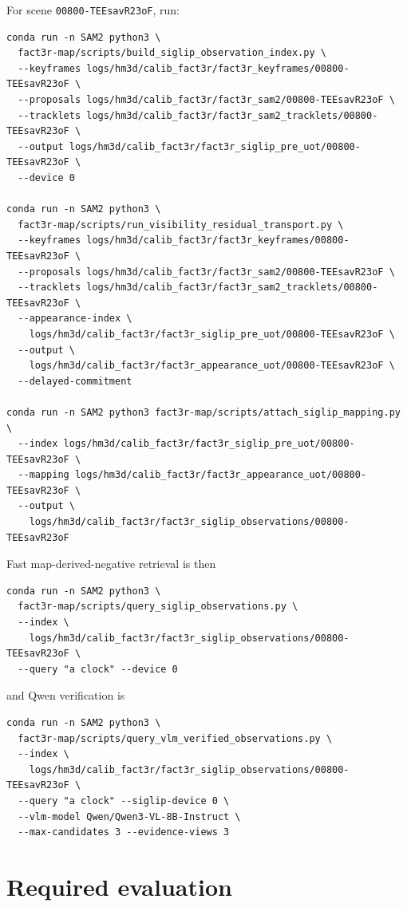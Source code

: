 \documentclass[11pt]{article}
\newcommand{\1}{\bm{1}}
\begin{document}
For scene \texttt{00800-TEEsavR23oF}, run:
\begin{verbatim}
conda run -n SAM2 python3 \
  fact3r-map/scripts/build_siglip_observation_index.py \
  --keyframes logs/hm3d/calib_fact3r/fact3r_keyframes/00800-TEEsavR23oF \
  --proposals logs/hm3d/calib_fact3r/fact3r_sam2/00800-TEEsavR23oF \
  --tracklets logs/hm3d/calib_fact3r/fact3r_sam2_tracklets/00800-TEEsavR23oF \
  --output logs/hm3d/calib_fact3r/fact3r_siglip_pre_uot/00800-TEEsavR23oF \
  --device 0

conda run -n SAM2 python3 \
  fact3r-map/scripts/run_visibility_residual_transport.py \
  --keyframes logs/hm3d/calib_fact3r/fact3r_keyframes/00800-TEEsavR23oF \
  --proposals logs/hm3d/calib_fact3r/fact3r_sam2/00800-TEEsavR23oF \
  --tracklets logs/hm3d/calib_fact3r/fact3r_sam2_tracklets/00800-TEEsavR23oF \
  --appearance-index \
    logs/hm3d/calib_fact3r/fact3r_siglip_pre_uot/00800-TEEsavR23oF \
  --output \
    logs/hm3d/calib_fact3r/fact3r_appearance_uot/00800-TEEsavR23oF \
  --delayed-commitment

conda run -n SAM2 python3 fact3r-map/scripts/attach_siglip_mapping.py \
  --index logs/hm3d/calib_fact3r/fact3r_siglip_pre_uot/00800-TEEsavR23oF \
  --mapping logs/hm3d/calib_fact3r/fact3r_appearance_uot/00800-TEEsavR23oF \
  --output \
    logs/hm3d/calib_fact3r/fact3r_siglip_observations/00800-TEEsavR23oF
\end{verbatim}

Fast map-derived-negative retrieval is then
\begin{verbatim}
conda run -n SAM2 python3 \
  fact3r-map/scripts/query_siglip_observations.py \
  --index \
    logs/hm3d/calib_fact3r/fact3r_siglip_observations/00800-TEEsavR23oF \
  --query "a clock" --device 0
\end{verbatim}
and Qwen verification is
\begin{verbatim}
conda run -n SAM2 python3 \
  fact3r-map/scripts/query_vlm_verified_observations.py \
  --index \
    logs/hm3d/calib_fact3r/fact3r_siglip_observations/00800-TEEsavR23oF \
  --query "a clock" --siglip-device 0 \
  --vlm-model Qwen/Qwen3-VL-8B-Instruct \
  --max-candidates 3 --evidence-views 3
\end{verbatim}

\section{Required evaluation}
\end{document}
